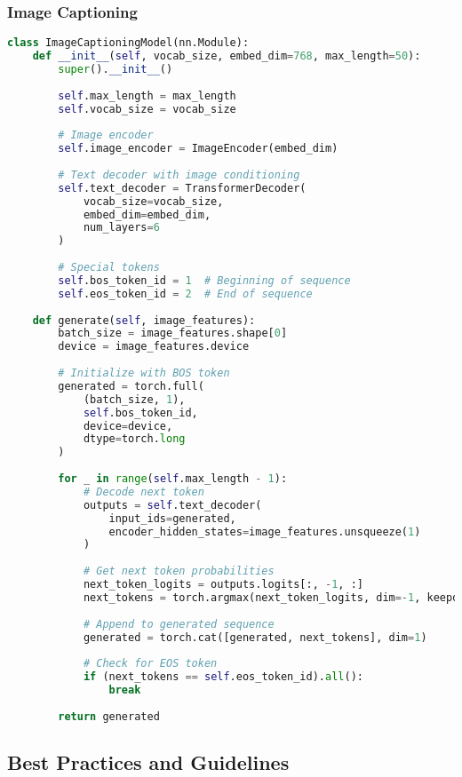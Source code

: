 \subsubsection{Image Captioning}

\begin{lstlisting}[language=Python, caption=Image captioning with image tokens]
class ImageCaptioningModel(nn.Module):
    def __init__(self, vocab_size, embed_dim=768, max_length=50):
        super().__init__()
        
        self.max_length = max_length
        self.vocab_size = vocab_size
        
        # Image encoder
        self.image_encoder = ImageEncoder(embed_dim)
        
        # Text decoder with image conditioning
        self.text_decoder = TransformerDecoder(
            vocab_size=vocab_size,
            embed_dim=embed_dim,
            num_layers=6
        )
        
        # Special tokens
        self.bos_token_id = 1  # Beginning of sequence
        self.eos_token_id = 2  # End of sequence
    
    def generate(self, image_features):
        batch_size = image_features.shape[0]
        device = image_features.device
        
        # Initialize with BOS token
        generated = torch.full(
            (batch_size, 1), 
            self.bos_token_id, 
            device=device, 
            dtype=torch.long
        )
        
        for _ in range(self.max_length - 1):
            # Decode next token
            outputs = self.text_decoder(
                input_ids=generated,
                encoder_hidden_states=image_features.unsqueeze(1)
            )
            
            # Get next token probabilities
            next_token_logits = outputs.logits[:, -1, :]
            next_tokens = torch.argmax(next_token_logits, dim=-1, keepdim=True)
            
            # Append to generated sequence
            generated = torch.cat([generated, next_tokens], dim=1)
            
            # Check for EOS token
            if (next_tokens == self.eos_token_id).all():
                break
        
        return generated
\end{lstlisting}

\subsection{Best Practices and Guidelines}

